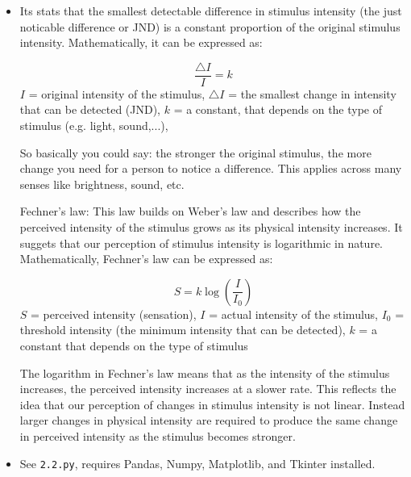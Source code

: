     \begin{exercise} \hfill
    \begin{itemize}
        \item[a)]
            Its stats that the smallest detectable difference in stimulus intensity 
            (the just noticable difference or JND)
            is a constant proportion of the original stimulus intensity.
            Mathematically, it can be expressed as:

            \[\frac{\triangle I}{I} = k\]
            $I$ = original intensity of the stimulus,
            $\triangle I$ = the smallest change in intensity that can be detected (JND),
            $k$ = a constant, that depends on the type of stimulus (e.g. light, sound,...),

            So basically you could say: the stronger the original stimulus,
            the more change you need
            for a person to notice a difference.
            This applies across many senses like brightness, sound, etc.

            Fechner's law:
            This law builds on Weber's law and describes how the perceived intensity of 
            the stimulus grows as its physical intensity increases.
            It suggets that our perception of stimulus intensity is logarithmic in nature.
            Mathematically, Fechner's law can be expressed as:

            \[S = k \log\left(\frac{I}{I_0}\right)\]
            \(S\) = perceived intensity (sensation),
            \(I\) = actual intensity of the stimulus,
            \(I_0\) = threshold intensity (the minimum intensity that can be detected),
            \(k\) = a constant that depends on the type of stimulus

            The logarithm in Fechner's law means that as the intensity of the stimulus increases,
            the perceived intensity increases at a slower rate. This reflects the idea that
            our perception of changes in stimulus intensity is not linear. Instead larger changes 
            in physical intensity are required to produce the same change in perceived intensity as
            the stimulus becomes stronger.

        \item[b)]
        See \lstinline|2.2.py|, requires Pandas, Numpy, Matplotlib, and Tkinter installed.
    \end{itemize}
    \end{exercise}

